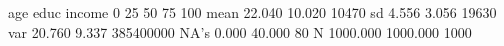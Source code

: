 \begin{Schunk}
\begin{Soutput}
          age     educ    income
0%      9.000    2.000    -56820
25%    19.000    8.000     -2225
50%    22.000   10.000     10570
75%    25.000   12.000     23770
100%   37.000   21.000     77190
mean   22.040   10.020     10470
sd      4.556    3.056     19630
var    20.760    9.337 385400000
NA's    0.000   40.000        80
N    1000.000 1000.000      1000
\end{Soutput}
\end{Schunk}
